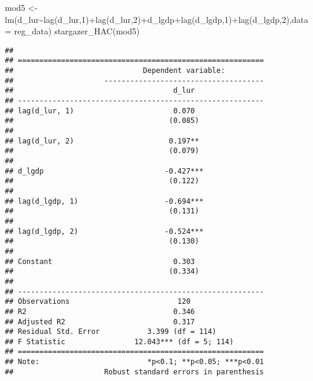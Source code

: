\documentclass[
]{article}
\newenvironment{Shaded}{\begin{snugshade}}{\end{snugshade}}
\newcommand{\AttributeTok}[1]{\textcolor[rgb]{0.77,0.63,0.00}{#1}}
\newcommand{\DecValTok}[1]{\textcolor[rgb]{0.00,0.00,0.81}{#1}}
\newcommand{\FunctionTok}[1]{\textcolor[rgb]{0.00,0.00,0.00}{#1}}
\newcommand{\NormalTok}[1]{#1}
\newcommand{\OtherTok}[1]{\textcolor[rgb]{0.56,0.35,0.01}{#1}}
\newcommand{\SpecialCharTok}[1]{\textcolor[rgb]{0.00,0.00,0.00}{#1}}
\begin{document}
\begin{Shaded}
\begin{Highlighting}[]
\NormalTok{mod5 }\OtherTok{\textless{}{-}} \FunctionTok{lm}\NormalTok{(d\_lur}\SpecialCharTok{\textasciitilde{}}\FunctionTok{lag}\NormalTok{(d\_lur,}\DecValTok{1}\NormalTok{)}\SpecialCharTok{+}\FunctionTok{lag}\NormalTok{(d\_lur,}\DecValTok{2}\NormalTok{)}\SpecialCharTok{+}\NormalTok{d\_lgdp}\SpecialCharTok{+}\FunctionTok{lag}\NormalTok{(d\_lgdp,}\DecValTok{1}\NormalTok{)}\SpecialCharTok{+}\FunctionTok{lag}\NormalTok{(d\_lgdp,}\DecValTok{2}\NormalTok{),}\AttributeTok{data =}\NormalTok{ reg\_data)}
\FunctionTok{stargazer\_HAC}\NormalTok{(mod5)}
\end{Highlighting}
\end{Shaded}

\begin{verbatim}
## 
## =========================================================
##                              Dependent variable:         
##                     -------------------------------------
##                                     d_lur                
## ---------------------------------------------------------
## lag(d_lur, 1)                       0.070                
##                                    (0.085)               
##                                                          
## lag(d_lur, 2)                      0.197**               
##                                    (0.079)               
##                                                          
## d_lgdp                            -0.427***              
##                                    (0.122)               
##                                                          
## lag(d_lgdp, 1)                    -0.694***              
##                                    (0.131)               
##                                                          
## lag(d_lgdp, 2)                    -0.524***              
##                                    (0.130)               
##                                                          
## Constant                            0.303                
##                                    (0.334)               
##                                                          
## ---------------------------------------------------------
## Observations                         120                 
## R2                                  0.346                
## Adjusted R2                         0.317                
## Residual Std. Error           3.399 (df = 114)           
## F Statistic                12.043*** (df = 5; 114)       
## =========================================================
## Note:                         *p<0.1; **p<0.05; ***p<0.01
##                     Robust standard errors in parenthesis
\end{verbatim}
\end{document}
